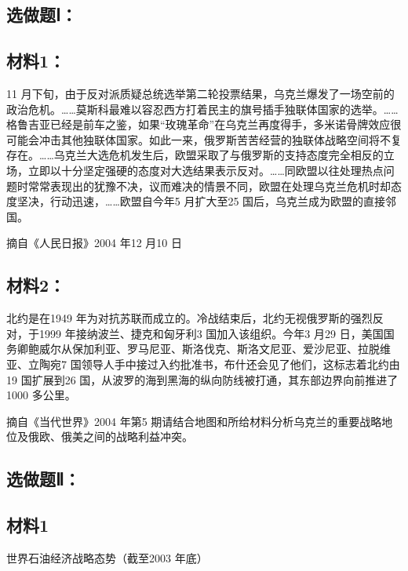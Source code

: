 \documentclass[UTF8,11pt]{ctexart}
\begin{document}
\subsection*{选做题Ⅰ：}

\subsection*{材料1：}

11 月下旬，由于反对派质疑总统选举第二轮投票结果，乌克兰爆发了一场空前的政治危机。……莫斯科最难以容忍西方打着民主的旗号插手独联体国家的选举。……格鲁吉亚已经是前车之鉴，如果“玫瑰革命”在乌克兰再度得手，多米诺骨牌效应很可能会冲击其他独联体国家。如此一来，俄罗斯苦苦经营的独联体战略空间将不复存在。……乌克兰大选危机发生后，欧盟采取了与俄罗斯的支持态度完全相反的立场，立即以十分坚定强硬的态度对大选结果表示反对。……同欧盟以往处理热点问题时常常表现出的犹豫不决，议而难决的情景不同，欧盟在处理乌克兰危机时却态度坚决，行动迅速，……欧盟自今年5 月扩大至25 国后，乌克兰成为欧盟的直接邻国。

摘自《人民日报》2004 年12 月10 日

\subsection*{材料2：}

北约是在1949 年为对抗苏联而成立的。冷战结束后，北约无视俄罗斯的强烈反对，于1999 年接纳波兰、捷克和匈牙利3 国加入该组织。今年3 月29 日，美国国务卿鲍威尔从保加利亚、罗马尼亚、斯洛伐克、斯洛文尼亚、爱沙尼亚、拉脱维亚、立陶宛7 国领导人手中接过入约批准书，布什还会见了他们，这标志着北约由19 国扩展到26 国，从波罗的海到黑海的纵向防线被打通，其东部边界向前推进了1000 多公里。

摘自《当代世界》2004 年第5 期请结合地图和所给材料分析乌克兰的重要战略地位及俄欧、俄美之间的战略利益冲突。

\subsection*{选做题Ⅱ：}

\subsection*{材料1}

世界石油经济战略态势（截至2003 年底）
\end{document}
